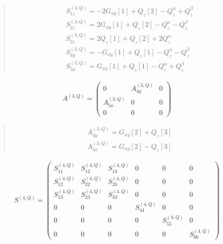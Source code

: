 \documentclass[fleqn,10pt]{jsarticle}
\begin{document}
\begin{quote}
\begin{align*}
& S^{(3,Q)}_{1z} = - 2 G_{xy}[1] + Q_{z}[2] - Q_{z}^{\alpha} + Q_{z}^{\beta} \\
& S^{(3,Q)}_{2z} = 2 G_{xy}[1] + Q_{z}[2] - Q_{z}^{\alpha} - Q_{z}^{\beta} \\
& S^{(3,Q)}_{3z} = 2 Q_{z}[1] + Q_{z}[2] + 2 Q_{z}^{\alpha} \\
& S^{(3,Q)}_{4y} = - G_{xy}[1] + Q_{z}[1] - Q_{z}^{\alpha} - Q_{z}^{\beta} \\
& S^{(3,Q)}_{5x} = G_{xy}[1] + Q_{z}[1] - Q_{z}^{\alpha} + Q_{z}^{\beta}
\end{align*}
\end{quote}
\begin{align*}
A^{(3,Q)} = \begin{pmatrix} 0 & A^{(3,Q)}_{4y} & 0 \\ A^{(3,Q)}_{5x} & 0 & 0 \\ 0 & 0 & 0 \end{pmatrix}
\end{align*}
\begin{quote}
\begin{align*}
& A^{(3,Q)}_{4y} = G_{xy}[2] + Q_{z}[3] \\
& A^{(3,Q)}_{5x} = G_{xy}[2] - Q_{z}[3]
\end{align*}
\end{quote}
\begin{align*}
S^{(4,Q)} = \begin{pmatrix} S^{(4,Q)}_{11} & S^{(4,Q)}_{12} & S^{(4,Q)}_{13} & 0 & 0 & 0 \\ S^{(4,Q)}_{12} & S^{(4,Q)}_{22} & S^{(4,Q)}_{23} & 0 & 0 & 0 \\ S^{(4,Q)}_{13} & S^{(4,Q)}_{23} & S^{(4,Q)}_{33} & 0 & 0 & 0 \\ 0 & 0 & 0 & S^{(4,Q)}_{44} & 0 & 0 \\ 0 & 0 & 0 & 0 & S^{(4,Q)}_{55} & 0 \\ 0 & 0 & 0 & 0 & 0 & S^{(4,Q)}_{66} \end{pmatrix}
\end{align*}
\end{document}
